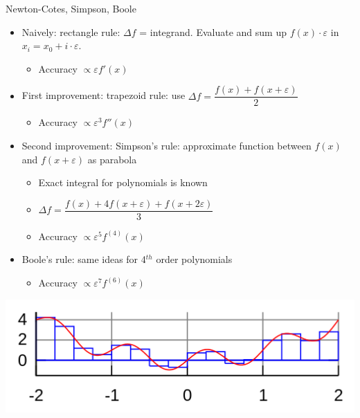 
\begin{frame}{Newton-Cotes, Simpson, Boole}
%
\begin{minipage}{.6\linewidth}
\small
\begin{itemize}
\item Naively: rectangle rule: $\Delta f$ = integrand. Evaluate and sum up $f(x) \cdot \varepsilon$ in $x_i = x_0 + i \cdot \varepsilon$.
	\vspace{-4pt}
	\begin{itemize}
	\item Accuracy $\propto \varepsilon f'(x)$ 
	\end{itemize}
	\vspace{-9pt}
\item First improvement: trapezoid rule: use $\Delta f = \dfrac{f(x) + f(x + \varepsilon)}{2}$
	\vspace{-4pt}
	\begin{itemize}
	\item Accuracy $\propto \varepsilon^3 f''(x)$ 
	\end{itemize}
	\vspace{-4pt}
\item Second improvement: Simpson's rule: approximate function between $f(x)$ and $f(x + \varepsilon)$ as parabola
	\begin{itemize}
	\item Exact integral for polynomials is known
	\item $\Delta f = \dfrac{f(x) + 4f(x + \varepsilon) + f(x + 2\varepsilon)}{3}$
	\item Accuracy $\propto \varepsilon^5 f^{(4)}(x)$ 
	\end{itemize}
	\vspace{-6pt}
\item Boole's rule: same ideas for 4$^{th}$ order polynomials
	\begin{itemize}
	\item Accuracy $\propto \varepsilon^7 f^{(6)}(x)$ 
	\end{itemize}
\end{itemize}
\end{minipage}
%
\begin{minipage}{.39\linewidth}
\includegraphics[width=\linewidth]{./gfx/03-rule01-rectangle}

\end{minipage}
\end{frame}
